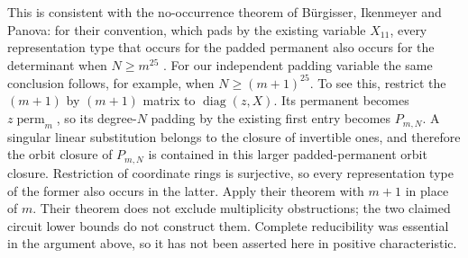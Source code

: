 This is consistent with the no-occurrence theorem of
B\"urgisser, Ikenmeyer and Panova: for their convention,
which pads by the existing variable $X_{11}$, every
representation type that occurs for the padded permanent
also occurs for the determinant when $N\geq m^{25}$
\cite[arXiv version~3, Theorem~1.4, p.~3]
{BurgisserIkenmeyerPanova2019}.
For our independent padding variable the same conclusion
follows, for example, when $N\geq(m+1)^{25}$.  To see this,
restrict the $(m+1)$ by $(m+1)$ matrix to
$\operatorname{diag}(z,X)$.  Its permanent becomes
$z\operatorname{perm}_m$, so its degree-$N$ padding by
the existing first entry becomes $P_{m,N}$.  A singular
linear substitution belongs to the closure of invertible
ones, and therefore the orbit closure of $P_{m,N}$ is
contained in this larger padded-permanent orbit closure.
Restriction of coordinate rings is surjective, so every
representation type of the former also occurs in the
latter.  Apply their theorem with $m+1$ in place of $m$.
Their theorem does not exclude multiplicity obstructions;
the two claimed circuit lower bounds do not construct them.
Complete reducibility was essential in the argument above,
so it has not been asserted here in positive characteristic.
